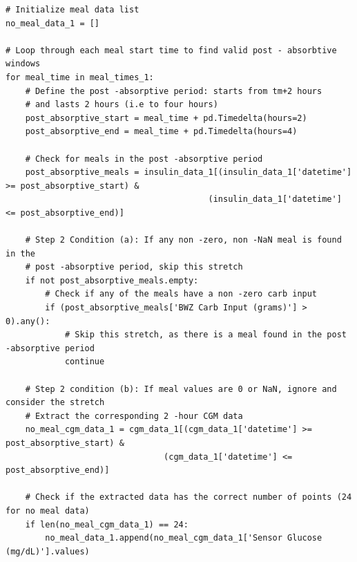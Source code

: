\begin{verbatim}
# Initialize meal data list
no_meal_data_1 = []
    
# Loop through each meal start time to find valid post - absorbtive windows
for meal_time in meal_times_1:
    # Define the post -absorptive period: starts from tm+2 hours
    # and lasts 2 hours (i.e to four hours)
    post_absorptive_start = meal_time + pd.Timedelta(hours=2)
    post_absorptive_end = meal_time + pd.Timedelta(hours=4)
    
    # Check for meals in the post -absorptive period
    post_absorptive_meals = insulin_data_1[(insulin_data_1['datetime'] >= post_absorptive_start) &
                                         (insulin_data_1['datetime'] <= post_absorptive_end)]
    
    # Step 2 Condition (a): If any non -zero, non -NaN meal is found in the
    # post -absorptive period, skip this stretch
    if not post_absorptive_meals.empty:
        # Check if any of the meals have a non -zero carb input
        if (post_absorptive_meals['BWZ Carb Input (grams)'] > 0).any():
            # Skip this stretch, as there is a meal found in the post -absorptive period
            continue
    
    # Step 2 condition (b): If meal values are 0 or NaN, ignore and consider the stretch
    # Extract the corresponding 2 -hour CGM data
    no_meal_cgm_data_1 = cgm_data_1[(cgm_data_1['datetime'] >= post_absorptive_start) & 
                                (cgm_data_1['datetime'] <= post_absorptive_end)]
    
    # Check if the extracted data has the correct number of points (24 for no meal data)
    if len(no_meal_cgm_data_1) == 24:
        no_meal_data_1.append(no_meal_cgm_data_1['Sensor Glucose (mg/dL)'].values)
\end{verbatim}

